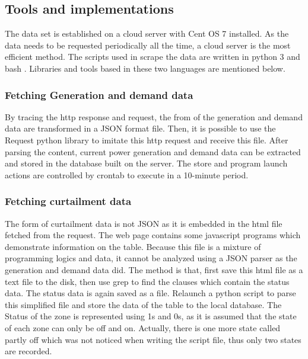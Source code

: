 \documentclass[12pt,a4paper]{report}
\begin{document}
        \subsection{Tools and implementations}
        The data set is established on a cloud server with Cent OS 7 installed. As the data needs to be requested periodically all the time, a cloud server is the most
        efficient method. The scripts used in scrape the data are written in python 3 \cite{website:python3} and bash \cite{website:bash}. Libraries and tools based in these two languages are mentioned below.

                \subsubsection{Fetching Generation and demand data}
                By tracing the http response and request, the from of the generation and demand data are transformed in a JSON format file. Then, it is possible to 
                use the Request python library \cite{website:requestpython} to imitate this http request and receive this file. After parsing the content, current power generation and demand data can
                be extracted and stored in the database built on the server. The store and program launch actions are controlled by crontab \cite{website:crontab} to execute in a 10-minute period.

                \subsubsection{Fetching curtailment data}
                \label{text_fetching_curtailment_data}
                The form of curtailment data is not JSON as it is embedded in the html file fetched from the request. The web page contains some javascript programs which demonstrate information
                on the table. Because this file is a mixture of programming logics and data, it cannot be analyzed using a JSON parser as the generation and demand data did. The method is that, first
                save this html file as a text file to the disk, then use grep \cite{website:grep} to find the clauses which contain the status data. The status data is again saved as a file. Relaunch
                a python script to parse this simplified file and store the data of the table to the local database. The Status of the zone is represented using 1s and 0s, as it is assumed that the state
                of each zone can only be off and on. Actually, there is one more state called partly off which was not noticed when writing the script file, thus only two states are recorded.
\end{document}
